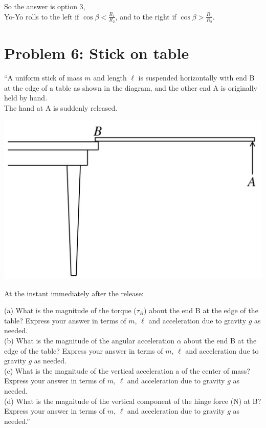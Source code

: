 \documentclass[12pt,a4paper]{report}
\begin{document}
So the answer is option 3,\\
Yo-Yo rolls to the left if $\displaystyle \cos \beta < \frac{R_1}{R_2}$, and to the right if $\displaystyle \cos \beta > \frac{R_1}{R_2}$.

\section{Problem 6: Stick on table}

``A uniform stick of mass $m$ and length $\ell$ is suspended horizontally with end B at the edge of a table as shown in the diagram, and the other end A is originally held by hand.\\
The hand at A is suddenly released.

\begin{center}
\includegraphics[scale=0.45]{Graphics/h7p6}
\end{center}

At the instant immediately after the release:

(a) What is the magnitude of the torque ($\tau_B$) about the end B at the edge of the table? Express your answer in terms of $m$, $\ell$ and acceleration due to gravity $g$ as needed.\\
(b) What is the magnitude of the angular acceleration $\alpha$ about the end B at the edge of the table? Express your answer in terms of $m$, $\ell$ and acceleration due to gravity $g$ as needed.\\
(c) What is the magnitude of the vertical acceleration a of the center of mass? Express your answer in terms of $m$, $\ell$ and acceleration due to gravity $g$ as needed.\\
(d) What is the magnitude of the vertical component of the hinge force (N) at B? Express your answer in terms of $m$, $\ell$ and acceleration due to gravity $g$ as needed.''
\end{document}
